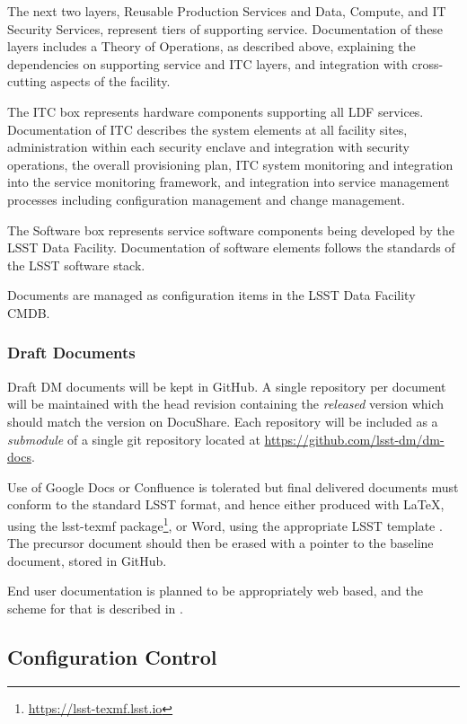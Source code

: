 The next two layers, Reusable Production Services and Data, Compute, and IT Security Services, represent tiers of supporting service. Documentation of these layers includes a Theory of Operations, as described above, explaining the dependencies on supporting service and ITC layers, and integration with cross-cutting aspects of the facility.

The ITC box represents hardware components supporting all LDF services. Documentation of ITC describes the system elements at all facility sites, administration within each security enclave and integration with security operations, the overall provisioning plan, ITC system monitoring and integration into the service monitoring framework, and integration into service management processes including configuration management and change management.

The Software box represents service software components being developed by the LSST Data Facility. Documentation of software elements follows the standards of the LSST software stack.

Documents are managed as configuration items in the LSST Data Facility CMDB.

\subsubsection{Draft Documents}

Draft DM documents will be kept in GitHub. A single repository per document will be maintained with the head revision containing the \emph{released } version which should match the version on DocuShare. Each repository will be included as a \emph{submodule} of a single git repository located at \url{https://github.com/lsst-dm/dm-docs}.

Use of Google Docs or Confluence is tolerated but final delivered documents must conform to the standard LSST format, and hence either produced with LaTeX, using the lsst-texmf package\footnote{\url{https://lsst-texmf.lsst.io}}, or Word, using the appropriate LSST template . The precursor document should then be erased with a pointer to the baseline document, stored in GitHub.

End user documentation is planned to be appropriately web based, and the scheme for that is described in .

\subsection {Configuration Control} \label{sect:config}

